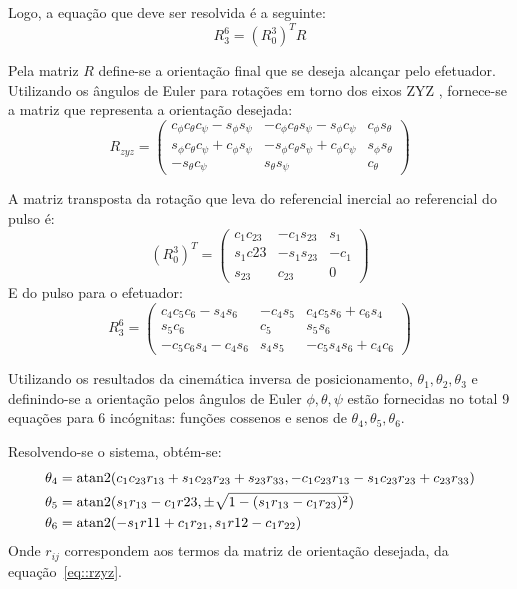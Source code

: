 Logo, a equação que deve ser resolvida é a seguinte:
%
\begin{equation}
	R_3^6 = (R_0^3)^T R
\end{equation}


Pela matriz $R$ define-se a orientação final que se deseja alcançar pelo
efetuador.
Utilizando os ângulos de Euler para rotações em torno dos eixos ZYZ , fornece-se
a matriz que representa a orientação desejada:
%
\begin{equation} \label{eq::rzyz}
R_{zyz} = 
\begin{pmatrix}
c_\phi c_\theta c_\psi - s_\phi s_\psi & -c_\phi c_\theta s_\psi - s_\phi c_\psi & c_\phi s_\theta\\ 
s_\phi c_\theta c_\psi + c_\phi s_\psi & -s_\phi c_\theta s_\psi + c_\phi c_\psi & s_\phi s_\theta\\ 
-s_\theta c_\psi & s_\theta s_\psi & c_\theta
\end{pmatrix}
\end{equation}
%

A matriz transposta da rotação que leva do referencial inercial ao referencial
do pulso é:
%
\begin{equation}
	(R_0^3)^T = 
\begin{pmatrix}
c_1 c_{23} & -c_1 s_{23}  & s_1 \\ 
s_1 c{23} & -s_1 s_{23}  & -c_1 \\ 
s_{23} & c_{23}  & 0 
\end{pmatrix}
\end{equation}
%
E do pulso para o efetuador:
%
\begin{equation}
R_3^6 = 
\begin{pmatrix}
{ c_4} { c_5} { c_6}-{ s_4} {
 s_6}&-{ c_4} { s_5}&{ c_4} { c_5} { s_6}+{ c_6} {
 s_4}\\ { s_5} { c_6}&{ c_5}&{ s_5} {
 s_6}\\ -{ c_5} { c_6} { s_4}-{ c_4} {
 s_6}&{ s_4} { s_5}&-{ c_5} { s_4} { s_6}+{ c_4} {
 c_6}
\end{pmatrix} 
\end{equation}
%

Utilizando os resultados da cinemática inversa de posicionamento,
$\theta_1, \theta_2, \theta_3$ e definindo-se a orientação pelos ângulos de
Euler $\phi, \theta, \psi$ estão fornecidas no total 9 equações para 6
incógnitas: funções cossenos e senos de $\theta_4, \theta_5, \theta_6$.

Resolvendo-se o sistema, obtém-se:
%
\begin{align}
	\theta_4 &= \operatorname{atan2}(c_1 c_{23} r_{13} + s_1 c_{23} r_{23} + s_{23} r_{33},
	-c_1 c_{23} r_{13} - s_1 c_{23} r_{23} + c_{23} r_{33} ) \label{eq::theta4} \\
	\theta_5 &= \operatorname{atan2}(s_1 r_{13} - c_1 r{23}, \pm \sqrt{1- (s_1 r_{13} - c_1
	r_{23})^2}) \label{eq::theta5} \\
	\theta_6 &= \operatorname{atan2}(-s_1 r{11} + c_1 r_{21}, s_1 r{12} - c_1 r_{22})
	\label{eq::theta6}
\end{align}
%
Onde $r_{ij}$ correspondem aos termos da matriz de orientação desejada, da
equação~\ref{eq::rzyz}.

